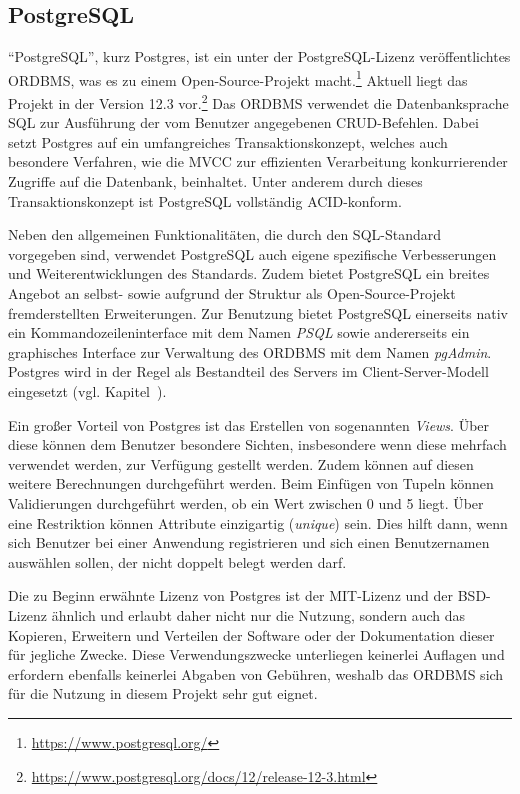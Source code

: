 \subsection{PostgreSQL}
\label{ssec:PostgreSQL}

\enquote{PostgreSQL}, kurz Postgres, ist ein unter der PostgreSQL-Lizenz\autocite{rf-psqllicense} veröffentlichtes \ac{ORDBMS}, was es zu einem Open-Source-Projekt macht.\footnote{\url{https://www.postgresql.org/}}
Aktuell liegt das Projekt in der Version 12.3 vor.\footnote{\url{https://www.postgresql.org/docs/12/release-12-3.html}}
Das \ac{ORDBMS} verwendet die Datenbanksprache \ac{SQL} zur Ausführung der vom Benutzer angegebenen \ac{CRUD}-Befehlen.
Dabei setzt Postgres auf ein umfangreiches Transaktionskonzept, welches auch besondere Verfahren, wie die \ac{MVCC} zur effizienten Verarbeitung konkurrierender Zugriffe auf die Datenbank, beinhaltet.
Unter anderem durch dieses Transaktionskonzept ist PostgreSQL vollständig \ac{ACID}-konform.\autocite[Vgl.][]{rf-psqlfeatures}

Neben den allgemeinen Funktionalitäten, die durch den \ac{SQL}-Standard vorgegeben sind, verwendet PostgreSQL auch eigene spezifische Verbesserungen und Weiterentwicklungen des Standards.
Zudem bietet PostgreSQL ein breites Angebot an selbst- sowie aufgrund der Struktur als Open-Source-Projekt fremderstellten Erweiterungen.
Zur Benutzung bietet PostgreSQL einerseits nativ ein Kommandozeileninterface mit dem Namen \emph{PSQL} sowie andererseits ein graphisches Interface zur Verwaltung des \ac{ORDBMS} mit dem Namen \emph{pgAdmin}.
Postgres wird in der Regel als Bestandteil des Servers im Client-Server-Modell eingesetzt (vgl. Kapitel~).

Ein großer Vorteil von Postgres ist das Erstellen von sogenannten \emph{Views}.
Über diese können dem Benutzer besondere Sichten, insbesondere wenn diese mehrfach verwendet werden, zur Verfügung gestellt werden.
Zudem können auf diesen weitere Berechnungen durchgeführt werden.
Beim Einfügen von Tupeln können Validierungen durchgeführt werden, \zb ob ein Wert zwischen 0 und 5 liegt.
Über eine Restriktion  können Attribute einzigartig (\emph{unique}) sein.
Dies hilft \ua dann, wenn sich Benutzer bei einer Anwendung registrieren und sich einen Benutzernamen auswählen sollen, der nicht doppelt belegt werden darf.

Die zu Beginn erwähnte Lizenz von Postgres ist der MIT-Lizenz und der BSD-Lizenz ähnlich und erlaubt daher nicht nur die Nutzung, sondern auch das Kopieren, Erweitern und Verteilen der Software oder der Dokumentation dieser für jegliche Zwecke.
Diese Verwendungszwecke unterliegen keinerlei Auflagen und erfordern ebenfalls keinerlei Abgaben von Gebühren, weshalb das \ac{ORDBMS} sich für die Nutzung in diesem Projekt sehr gut eignet.\autocite[Vgl.][]{rf-psqllicense}
